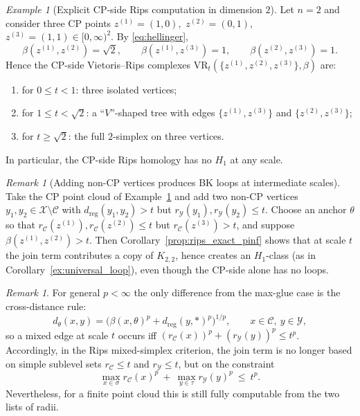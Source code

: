 \documentclass[11pt]{amsart}
\theoremstyle{definition}
\theoremstyle{remark}
\newtheorem{remark}[theorem]{Remark}
\newtheorem{example}[theorem]{Example}
\newcommand{\1}{\mathbbm{1}}
\newcommand{\VR}{\mathrm{VR}}
\begin{document}
\begin{example}[Explicit CP-side Rips computation in dimension $2$]\label{ex:cp_rips_dim2}
Let $n=2$ and consider three CP points $z^{(1)}=(1,0),$ $z^{(2)}=(0,1),$ $z^{(3)}=(1,1)\in[0,\infty)^2.$
By \eqref{eq:hellinger},
\[
\beta(z^{(1)},z^{(2)})=\sqrt{2},\qquad
\beta(z^{(1)},z^{(3)})=1,\qquad
\beta(z^{(2)},z^{(3)})=1.
\]
Hence the CP-side Vietoris--Rips complexes $\VR_t(\{z^{(1)},z^{(2)},z^{(3)}\},\beta)$ are:
\begin{enumerate}
\item[(i)] for $0\le t<1$: three isolated vertices;
\item[(ii)] for $1\le t<\sqrt{2}$: a ``$V$''-shaped tree with edges $\{z^{(1)},z^{(3)}\}$ and $\{z^{(2)},z^{(3)}\}$;
\item[(iii)] for $t\ge\sqrt{2}$: the full $2$-simplex on three vertices.
\end{enumerate}
In particular, the CP-side Rips homology has no $H_1$ at any scale.
\end{example}

\begin{remark}[Adding non-CP vertices produces BK loops at intermediate scales]
Take the CP point cloud of Example~\ref{ex:cp_rips_dim2} and add two non-CP vertices $y_1,y_2\in\mathcal X\setminus\mathcal C$
with $d_{\mathrm{reg}}(y_1,y_2)>t$ but $r_{\mathcal Y}(y_1),r_{\mathcal Y}(y_2)\le t$.
Choose an anchor $\theta$ so that $r_{\mathcal C}(z^{(1)}),r_{\mathcal C}(z^{(2)})\le t$ but $r_{\mathcal C}(z^{(3)})>t$, and suppose $\beta(z^{(1)}, z^{(2)})>t$.
Then Corollary~\ref{prop:rips_exact_pinf} shows that at scale $t$ the join term contributes a copy of $K_{2,2}$,
hence creates an $H_1$-class (as in Corollary~\ref{ex:universal_loop}), even though the CP-side alone has no loops.
\end{remark}
\begin{remark}
For general $p<\infty$ the only difference from the max-glue case is the cross-distance rule:
\[
d_\theta(x,y)=\bigl(\beta(x,\theta)^p+d_{\mathrm{reg}}(y,\ast)^p\bigr)^{1/p},
\qquad x\in\mathcal C,\ y\in\mathcal Y,
\]
so a mixed edge at scale $t$ occurs iff $(r_{\mathcal C}(x))^p+(r_{\mathcal Y}(y))^p\le t^p$.
Accordingly, in the Rips mixed-simplex criterion, the join term is no longer based on simple sublevel sets
$r_{\mathcal C}\le t$ and $r_{\mathcal Y}\le t$, but on the constraint
\[
\max_{x\in\sigma} r_{\mathcal C}(x)^p\ +\ \max_{y\in\tau} r_{\mathcal Y}(y)^p\ \le\ t^p.
\]
Nevertheless, for a finite point cloud this is still fully computable from the two lists of radii.
\end{remark}
\end{document}
